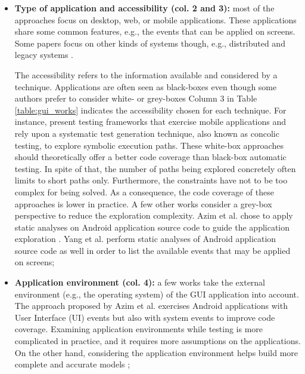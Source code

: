 \begin{itemize}
	\item \textbf{Type of application and accessibility (col.
	2 and 3):} most of the approaches focus on desktop, web, or
	mobile applications. These applications share some common
	features, e.g., the events that can be applied on screens.
	Some papers focus on other kinds of systems though, e.g.,
	distributed and legacy systems \cite{hungar2002}.

	The accessibility refers to the information available and
	considered by a technique. Applications are often seen as
	black-boxes even though some authors prefer to consider
	white- or grey-boxes Column 3 in Table
	\ref{table:gui_works} indicates the accessibility chosen
	for each technique. For instance,
	\cite{concolicandroid12,5416728} present testing frameworks
	that exercise mobile applications and rely upon a
	systematic test generation technique, also known as concolic
	testing, to explore symbolic execution paths. These white-box
	approaches should theoretically offer a better code coverage
    than black-box automatic testing. In spite of that, the
    number of paths being explored concretely often limits to
    short paths only. Furthermore, the constraints have not to be
    too complex for being solved. As a consequence, the code
    coverage of these approaches is lower in practice.
	A few other works consider a grey-box perspective to reduce
	the exploration complexity. Azim et al. chose to apply static
	analyses on Android application source code to guide the
	application exploration \cite{Azim13}. Yang et al.
	\cite{WPX13} perform static analyses of Android application
	source code as well in order to list the available events
	that may be applied on screens;

	\item \textbf{Application environment (col. 4):} a few works
	\cite{Azim13,SP15} take the external environment (e.g., the
	operating system) of the GUI application into account.
	The approach proposed by Azim et al. \cite{Azim13} exercises
	Android applications with User Interface (UI) events but also
	with system events to improve code coverage. Examining
	application environments while testing is more complicated in
	practice, and it requires more assumptions on the
    applications. On the other hand, considering the application
    environment helps build more complete and accurate models
    \cite{SP15};



\end{itemize}
